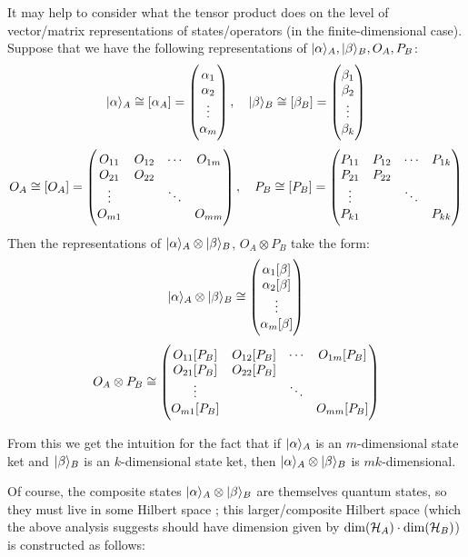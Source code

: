 It may help to consider what the tensor product does on the level of vector/matrix representations of states/operators (in the finite-dimensional case). Suppose that we have the following representations of $\lvert \alpha \rangle_A, \lvert \beta \rangle_B, O_A, P_B$:
\begin{equation}
    \lvert \alpha \rangle_A \cong [\alpha_A] = \begin{pmatrix}\alpha_1 \\ \alpha_2 \\ \vdots \\ \alpha_m\end{pmatrix}, \quad \lvert \beta \rangle_B \cong [\beta_B] = \begin{pmatrix}\beta_1 \\ \beta_2 \\ \vdots \\ \beta_k\end{pmatrix}
\end{equation}
\begin{equation}
    O_A \cong [O_A] = \begin{pmatrix}O_{11} & O_{12} & \cdots & O_{1m} \\ O_{21} & O_{22} & & \\ \vdots & & \ddots & \\ O_{m1} & & & O_{mm}\end{pmatrix}, \quad P_B \cong [P_B] = \begin{pmatrix}P_{11} & P_{12} & \cdots & P_{1k} \\ P_{21} & P_{22} & & \\ \vdots & & \ddots & \\ P_{k1} & & & P_{kk}\end{pmatrix}
\end{equation}
Then the representations of $\lvert \alpha \rangle_A \otimes \lvert \beta \rangle_B$, $O_A \otimes P_B$ take the form:
\begin{equation}
    \lvert \alpha \rangle_A \otimes \lvert \beta \rangle_B \cong \begin{pmatrix}\alpha_1[\beta] \\ \alpha_2[\beta] \\ \vdots \\ \alpha_{m}[\beta]\end{pmatrix}
\end{equation}
\begin{equation}
    O_A \otimes P_B \cong \begin{pmatrix}O_{11}[P_B] & O_{12}[P_B] & \cdots & O_{1m}[P_B] \\ O_{21}[P_B] & O_{22}[P_B] & & \\ \vdots & & \ddots & \\ O_{m1}[P_B] & & & O_{mm}[P_B]\end{pmatrix}
\end{equation}

From this we get the intuition for the fact that if $\lvert \alpha \rangle_A$ is an $m$-dimensional state ket and $\lvert \beta \rangle_B$ is an $k$-dimensional state ket, then $\lvert \alpha \rangle_A \otimes \lvert \beta \rangle_B$ is $mk$-dimensional. 

Of course, the composite states $\lvert \alpha \rangle_A \otimes \lvert \beta \rangle_B$ are themselves quantum states, so they must live in some Hilbert space ; this larger/composite Hilbert space (which the above analysis suggests should have dimension given by $\dim(\mathcal{H}_A) \cdot \dim(\mathcal{H}_B)$) is constructed as follows:

